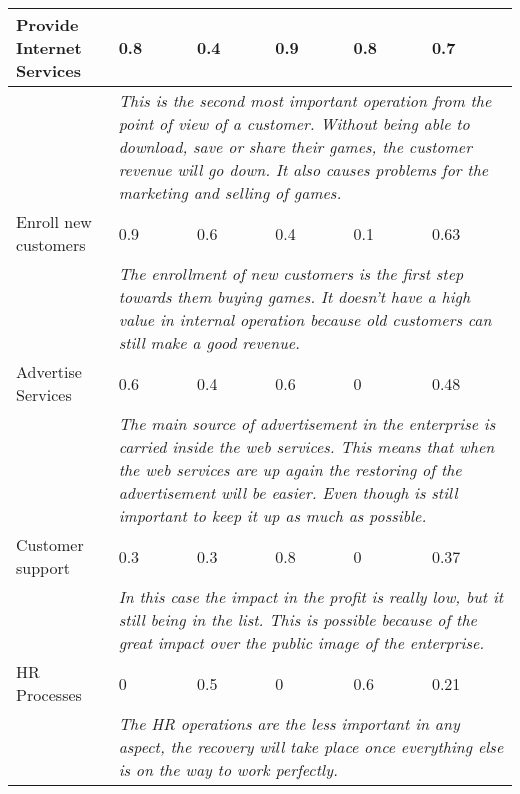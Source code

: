 \begin{longtable}{| p{3.4cm} | p{2cm} | p{2cm} | p{2cm} | p{2cm} | p{1cm} |}
		Provide Internet Services & 0.8 & 0.4 & 0.9 & 0.8 & 0.7\\\hline
		& \multicolumn{5}{|p{9cm}|}{\textit{This is the second most important operation from the point of view of a customer. Without being able to download, save or share their games, the customer revenue will go down. It also causes problems for the marketing and selling of games.}}\\\hline
		Enroll new customers & 0.9 & 0.6 & 0.4 & 0.1 & 0.63\\\hline
		& \multicolumn{5}{|p{9cm}|}{\textit{The enrollment of new customers is the first step towards them buying games. It doesn't have a high value in internal operation because old customers can still make a good revenue.}}\\\hline
		Advertise Services & 0.6 & 0.4 & 0.6 & 0 & 0.48\\\hline
		& \multicolumn{5}{|p{9cm}|}{\textit{The main source of advertisement in the enterprise is carried inside the web services. This means that when the web services are up again the restoring of the advertisement will be easier. Even though is still important to keep it up as much as possible.}}\\\hline
		Customer support & 0.3 & 0.3 & 0.8 & 0 & 0.37\\\hline
		& \multicolumn{5}{|p{9cm}|}{\textit{In this case the impact in the profit is really low, but it still being in the list. This is possible because of the great impact over the public image of the enterprise.}}\\\hline
		HR Processes & 0 & 0.5 & 0 & 0.6 & 0.21\\\hline
		& \multicolumn{5}{|p{9cm}|}{\textit{The HR operations are the less important in any aspect, the recovery will take place once everything else is on the way to work perfectly.}}\\\hline
\end{longtable}